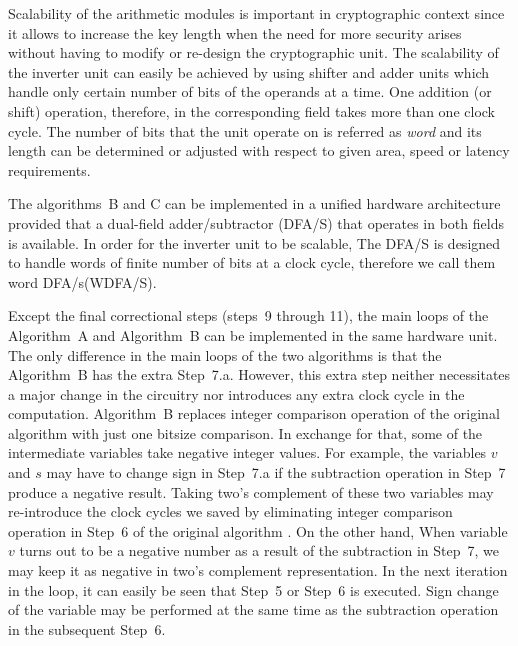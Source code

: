 \documentclass[twocolumn]{IEEEtran}
\begin{document}
Scalability of the arithmetic modules is important in cryptographic 
context since it allows to increase the key length when the need
for more security arises without having to modify or re-design
the cryptographic unit. The scalability of the inverter unit can easily 
be achieved by using shifter and adder units which handle only certain
number of bits of the operands at a time. One addition (or shift) operation,
therefore, in the corresponding field takes more than one clock cycle.
The number of bits that the unit operate on is referred as {\it word} and its
length can be determined or adjusted with respect to 
given area, speed or latency requirements. 

The algorithms~B and C can be implemented in a unified hardware architecture 
provided that a dual-field adder/subtractor (DFA/S) that operates in both fields
is available. In order for the inverter unit to be scalable,
The DFA/S is designed to handle words of finite number of bits at a clock
cycle, therefore we call them word DFA/s(WDFA/S).

Except the final correctional steps (steps~9 through 11), 
the main loops of the Algorithm~A and Algorithm~B 
can be implemented in the same
hardware unit. The only difference in the main loops of the 
two algorithms is that the Algorithm~B has the extra Step~7.a. 
However, this extra step neither necessitates a major change 
in the circuitry nor introduces any extra clock cycle in the 
computation. Algorithm~B replaces integer comparison operation
of the original algorithm with just one bitsize comparison.
In exchange for that, some of the intermediate variables
take negative integer values. For example, the variables
$v$ and $s$ may have to change sign in Step~7.a if the subtraction 
operation in Step~7 produce a negative result. Taking two's
complement of these two variables may re-introduce the clock
cycles we saved by eliminating integer comparison operation
in Step~6 of the original algorithm \cite{K95:The}. On the other hand, When 
variable $v$ turns out to be a negative number as a result
of the subtraction in Step~7, we may keep it as negative in two's
complement representation. In the
next iteration in the loop, it can easily be seen that Step~5
or Step~6 is executed. 
Sign change of the variable may be performed at the
same time as the subtraction operation in the subsequent Step~6.
\end{document}
